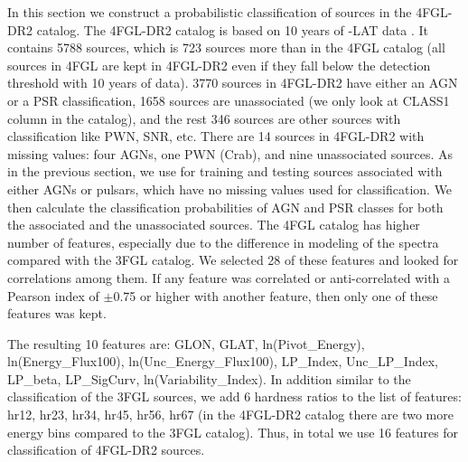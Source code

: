 In this section we construct a probabilistic classification of sources in the 4FGL-DR2 catalog. The 4FGL-DR2 catalog \citep{2020arXiv200511208B} 
is based on 10 years of \Fermi-LAT data \citep[compared to 8 years of data in the 4FGL catalog,][]{2020ApJS..247...33A}.
It contains 5788 sources, which is 723 sources more than in the 4FGL catalog (all sources in 4FGL are kept in 4FGL-DR2 even if they fall
below the detection threshold with 10 years of data). 
3770 sources in 4FGL-DR2 have either an  AGN or a PSR classification, 
1658 sources are unassociated (we only look at CLASS1 column in the catalog), and the rest 346 sources are other sources with classification like PWN, SNR, etc.
There are 14 sources in 4FGL-DR2 with missing values: four AGNs, one PWN (Crab), and nine unassociated sources.
As in the previous section, we use for training and testing sources associated with either AGNs or pulsars,
which have no missing values used for classification.
We then calculate the classification probabilities of AGN and PSR classes for both the associated and the unassociated sources.
The 4FGL catalog has higher number of features, especially due to the difference in modeling of the spectra compared with the 3FGL catalog. 
We selected 28 of these features and looked for correlations among them. If any feature was correlated or anti-correlated with a Pearson index of $\pm$0.75 or higher with another feature, then only one of these features was kept. 

The resulting 10 features are:
GLON, GLAT, ln(Pivot\_Energy), ln(Energy\_Flux100), ln(Unc\_Energy\_Flux100), LP\_Index, Unc\_LP\_Index, LP\_beta, LP\_SigCurv, ln(Variability\_Index).
In addition similar to the classification of the 3FGL sources, we add 6 hardness ratios to the list of features:
hr12, hr23, hr34, hr45, hr56, hr67 (in the 4FGL-DR2 catalog there are two more energy bins compared to the 3FGL catalog).
Thus, in total we use 16 features for classification of 4FGL-DR2 sources.


